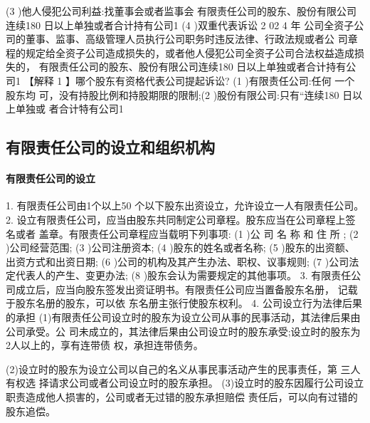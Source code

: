 \documentclass[UTF8,12pt]{ctexart}
\numberwithin{equation}{section} %
\numberwithin{figure}{section}
\numberwithin{table}{section}
\begin{document}
	(3 )他人侵犯公司利益:找董事会或者监事会 有限责任公司的股东、股份有限公司连续180 日以上单独或者合计持有公司1%
	(4 )双重代表诉讼
	2 02 4 年
	公司全资子公司的董事、监事、高级管理人员执行公司职务时违反法律、行政法规或者公 司章程的规定给全资子公司造成损失的，或者他人侵犯公司全资子公司合法权益造成损失的， 有限责任公司的股东、股份有限公司连续180 日以上单独或者合计持有公司1%
	【解释 1 】哪个股东有资格代表公司提起诉讼? (1 )有限责任公司:任何 一个股东均 可，没有持股比例和持股期限的限制;(2 )股份有限公司:只有“连续180 日以上单独或 者合计特有公司1%
	
	
	\subsection{有限责任公司的设立和组织机构}
	
	\paragraph{有限责任公司的设立}
	1. 有限责任公司由1个以上50 个以下股东出资设立，允许设立一人有限责任公司。
	2. 设立有限责任公司，应当由股东共同制定公司章程。股东应当在公司章程上签名或者 盖章。有限责任公司章程应当载明下列事项:
	(1 )公 司 名 称 和 住 所 ;
	(2 )公司经营范围;
	(3 )公司注册资本;
	(4 )股东的姓名或者名称;
	(5 )股东的出资额、出资方式和出资日期;
	(6 )公司的机构及其产生办法、职权、议事规则;
	(7 )公司法定代表人的产生、变更办法;
	(8 )股东会认为需要规定的其他事项。
	3. 有限责任公司成立后，应当向股东签发出资证明书。有限责任公司应当置备股东名册， 记载于股东名册的股东，可以依 东名册主张行使股东权利。
	4. 公司设立行为法律后果的承担 (1)有限责任公司设立时的股东为设立公司从事的民事活动，其法律后果由公司承受。公 司未成立的，其法律后果由公司设立时的股东承受;设立时的股东为2人以上的，享有连带债 权，承担连带债务。
	
	 (2)设立时的股东为设立公司以自己的名义从事民事活动产生的民事责任，第 三人有权选 择请求公司或者公司设立时的股东承担。 (3)设立时的股东因履行公司设立职责造成他人损害的，公司或者无过错的股东承担赔偿 责任后，可以向有过错的股东追偿。
	
\end{document}
